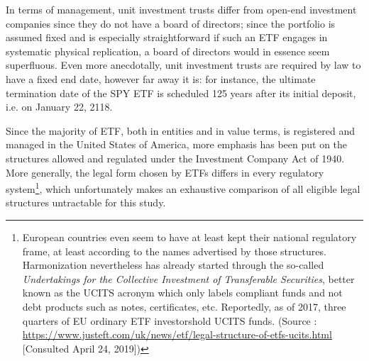 In terms of management, unit investment trusts differ from open-end investment companies since they do not have a board of directors; since the portfolio is assumed fixed and is especially straightforward if such an ETF engages in systematic physical replication, a board of directors would in essence seem superfluous. Even more anecdotally, unit investment trusts are required by law to have a fixed end date, however far away it is: for instance, the ultimate termination date of the SPY ETF is scheduled 125 years after its initial deposit, i.e. on January 22, 2118.

Since the majority of ETF, both in entities and in value terms, is registered and managed in the United States of America, more emphasis has been put on the structures allowed and regulated under the Investment Company Act of 1940. More generally, the legal form chosen by ETFs differs in every regulatory system\footnote{European countries even seem to have at least kept their national regulatory frame, at least according to the names advertised by those structures. Harmonization nevertheless has already started through the so-called \textit{Undertakings for the Collective Investment of Transferable Securities}, better known as the UCITS acronym which only labels compliant funds and not debt products such as notes, certificates, etc. Reportedly, as of 2017, three quarters of EU ordinary ETF investorshold UCITS funds. (Source : \url{https://www.justeft.com/uk/news/etf/legal-structure-of-etfs-ucits.html} [Consulted April 24, 2019])}, which unfortunately makes an exhaustive comparison of all eligible legal structures untractable for this study.

